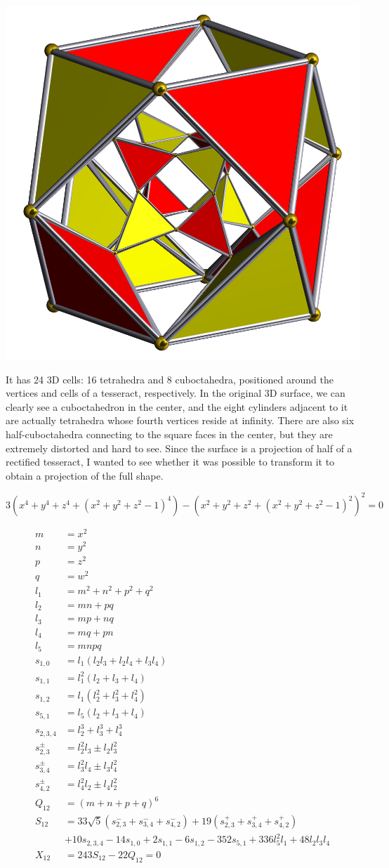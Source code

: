 \documentclass{article}
\begin{document}
\begin{center}
  \includegraphics[width=0.25\linewidth]{rit.png}
\end{center}
It has 24 3D cells: 16 tetrahedra and 8 cuboctahedra,
positioned around the vertices and cells of a tesseract, respectively.
In the original 3D surface, we can clearly see a cuboctahedron in the center,
and the eight cylinders adjacent to it are actually tetrahedra
whose fourth vertices reside at infinity.
There are also six half-cuboctahedra connecting to the square faces in the center,
but they are extremely distorted and hard to see.
Since the surface is a projection of half of a rectified tesseract,
I wanted to see whether it was possible to transform it
to obtain a projection of the full shape.

$$3(x^4+y^4+z^4+(x^2+y^2+z^2-1)^4)-(x^2+y^2+z^2+(x^2+y^2+z^2-1)^2)^2 = 0$$

\begin{align*}
  m &= x^2 \\
  n &= y^2 \\
  p &= z^2 \\
  q &= w^2 \\
  l_1 &= m^2+n^2+p^2+q^2 \\
  l_2 &= mn+pq \\
  l_3 &= mp+nq \\
  l_4 &= mq+pn \\
  l_5 &= mnpq \\
  s_{1,0} &= l_1(l_2l_3+l_2l_4+l_3l_4) \\
  s_{1,1} &= l_1^2(l_2+l_3+l_4) \\
  s_{1,2} &= l_1(l_2^2+l_3^2+l_4^2) \\
  s_{5,1} &= l_5(l_2+l_3+l_4) \\
  s_{2,3,4} &= l_2^3+l_3^3+l_4^3 \\
  s_{2,3}^{\pm} &= l_2^2l_3 \pm l_2l_3^2 \\
  s_{3,4}^{\pm} &= l_3^2l_4 \pm l_3l_4^2 \\
  s_{4,2}^{\pm} &= l_4^2l_2 \pm l_4l_2^2 \\
  Q_{12} &= (m+n+p+q)^6 \\
  S_{12} &= 33\sqrt{5}(s_{2,3}^{-}+s_{3,4}^{-}+s_{4,2}^{-})+19(s_{2,3}^{+}+s_{3,4}^{+}+s_{4,2}^{+}) \\
  &+ 10s_{2,3,4}-14s_{1,0}+2s_{1,1}-6s_{1,2}-352s_{5,1}+336l_5^2l_1+48l_2l_3l_4 \\
  X_{12} &= 243S_{12}-22Q_{12}=0
\end{align*}
\end{document}
